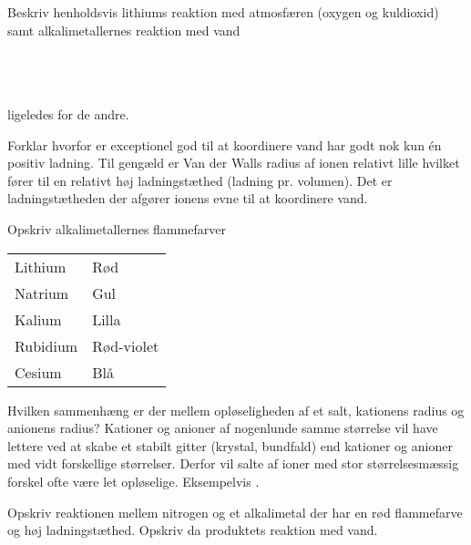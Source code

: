 \begin{flashcard}[Reaktion]{Beskriv henholdsvis lithiums reaktion med atmosfæren (oxygen og kuldioxid) samt alkalimetallernes reaktion med vand}

\\
\\ \vspace{7pt}
\\
ligeledes for de andre.
\end{flashcard}

\begin{flashcard}[Egenskab]{Forklar hvorfor  er exceptionel god til at koordinere vand}
 har godt nok kun én positiv ladning. Til gengæld er Van der Walls radius af ionen relativt lille hvilket fører til en relativt høj ladningstæthed (ladning pr. volumen). Det er ladningstætheden der afgører ionens evne til at koordinere vand.
\end{flashcard}

\begin{flashcard}[Egenskab]{Opskriv alkalimetallernes flammefarver}
\begin{tabular}{ l l }
Lithium & \color{red}Rød \\
Natrium & \color{yellow}Gul \\
Kalium & \color{violet}Lilla \\
Rubidium & \color{red}Rød-violet \\
Cesium & \color{blue}Blå
\end{tabular}
\end{flashcard}

\begin{flashcard}[Egenskab]{Hvilken sammenhæng er der mellem opløseligheden af et salt, kationens radius og anionens radius?}
Kationer og anioner af nogenlunde samme størrelse vil have lettere ved at skabe et stabilt gitter (krystal, bundfald) end kationer og anioner med vidt forskellige størrelser. Derfor vil salte af ioner med stor størrelsesmæssig forskel ofte være let opløselige. Eksempelvis .
\end{flashcard}

\begin{flashcard}[Reaktion]{Opskriv reaktionen mellem nitrogen og et alkalimetal der har en rød flammefarve og høj ladningstæthed. Opskriv da produktets reaktion med vand.}
 \\ \vspace{7pt}
\end{flashcard}

